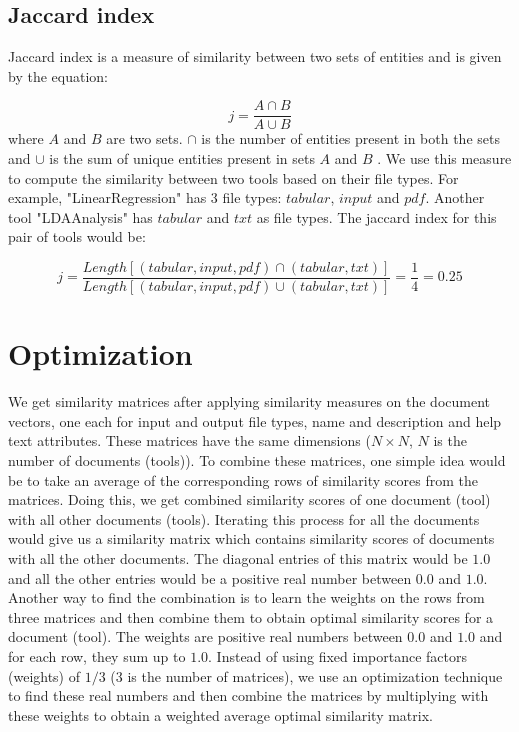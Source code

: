 \subsection{Jaccard index}
Jaccard index is a measure of similarity between two sets of entities and is given by the equation:

\begin{equation}
j = \frac{A \cap B}{A \cup B}
\end{equation}
where $A$ and $B$ are two sets. $\cap$ is the number of entities present in both the sets and $\cup$ is the sum of unique entities present in sets $A$ and $B$ \cite{Ivchenko1998}. We use this measure to compute the similarity between two tools based on their file types. For example, "LinearRegression" has 3 file types: $tabular$, $input$ and $pdf$. Another tool "LDAAnalysis" has $tabular$ and $txt$ as file types. The jaccard index for this pair of tools would be:

\begin{equation}
j = \frac{Length[(tabular, input, pdf) \cap (tabular, txt)]}{Length[(tabular, input, pdf) \cup (tabular, txt)]} = \frac{1}{4} = 0.25
\end{equation}

\section{Optimization}
We get similarity matrices after applying similarity measures on the document vectors, one each for input and output file types, name and description and help text attributes. These matrices have the same dimensions ($N \times N$, $N$ is the number of documents (tools)). To combine these matrices, one simple idea would be to take an average of the corresponding rows of similarity scores from the matrices. Doing this, we get combined similarity scores of one document (tool) with all other documents (tools). Iterating this process for all the documents would give us a similarity matrix which contains similarity scores of documents with all the other documents. The diagonal entries of this matrix would be $1.0$ and all the other entries would be a positive real number between $0.0$ and $1.0$. Another way to find the combination is to learn the weights on the rows from three matrices and then combine them to obtain optimal similarity scores for a document (tool). The weights are positive real numbers between $0.0$ and $1.0$ and for each row, they sum up to $1.0$. Instead of using fixed importance factors (weights) of $1/3$ ($3$ is the number of matrices), we use an optimization technique to find these real numbers and then combine the matrices by multiplying with these weights to obtain a weighted average optimal similarity matrix.

